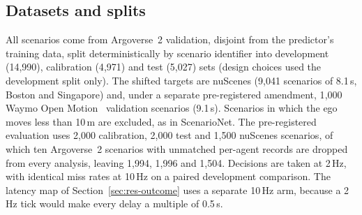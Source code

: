 \documentclass[lettersize,journal]{IEEEtran}
\begin{document}
\subsection{Datasets and splits}
\label{sec:data}
All scenarios come from Argoverse~2 validation, disjoint from the
predictor's training data, split deterministically by scenario identifier
into development (14{,}990), calibration (4{,}971) and test (5{,}027) sets
(design choices used the development split only). The shifted targets are
nuScenes (9{,}041 scenarios of 8.1\,s, Boston and Singapore) and, under a
separate pre-registered amendment, 1{,}000 Waymo Open
Motion~\cite{waymo2021} validation scenarios (9.1\,s). Scenarios in which
the ego moves less than 10\,m are excluded, as in ScenarioNet. The
pre-registered evaluation uses 2{,}000 calibration, 2{,}000 test and
1{,}500 nuScenes scenarios, of which ten Argoverse~2 scenarios with
unmatched per-agent records are dropped from every analysis, leaving
1{,}994, 1{,}996 and 1{,}504. Decisions are taken at 2\,Hz, with identical
miss rates at 10\,Hz on a paired development comparison. The latency map of Section~\ref{sec:res-outcome} uses a separate 10\,Hz arm, because a 2\,Hz tick would make every delay a multiple of 0.5\,s.
\end{document}
